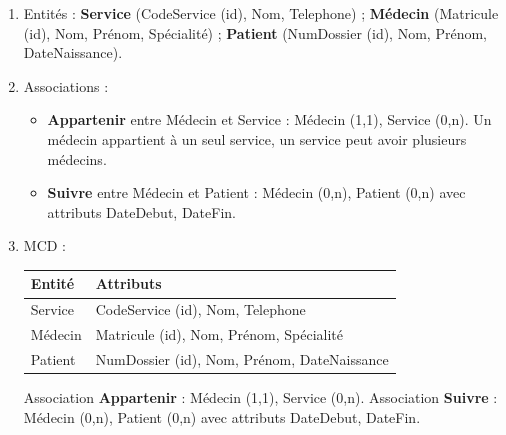 \begin{enumerate}
    \item Entités : \textbf{Service} (CodeService (id), Nom, Telephone) ; \textbf{Médecin} (Matricule (id), Nom, Prénom, Spécialité) ; \textbf{Patient} (NumDossier (id), Nom, Prénom, DateNaissance).
    \item Associations :
    \begin{itemize}
        \item \textbf{Appartenir} entre Médecin et Service : Médecin (1,1), Service (0,n). Un médecin appartient à un seul service, un service peut avoir plusieurs médecins.
        \item \textbf{Suivre} entre Médecin et Patient : Médecin (0,n), Patient (0,n) avec attributs DateDebut, DateFin.
    \end{itemize}
    \item MCD :
    \begin{center}
    \begin{tabular}{|l|l|}
    \hline
    \textbf{Entité} & \textbf{Attributs} \\
    \hline
    Service & CodeService (id), Nom, Telephone \\
    \hline
    Médecin & Matricule (id), Nom, Prénom, Spécialité \\
    \hline
    Patient & NumDossier (id), Nom, Prénom, DateNaissance \\
    \hline
    \end{tabular}
    \end{center}
    Association \textbf{Appartenir} : Médecin (1,1), Service (0,n).
    Association \textbf{Suivre} : Médecin (0,n), Patient (0,n) avec attributs DateDebut, DateFin.
\end{enumerate}

